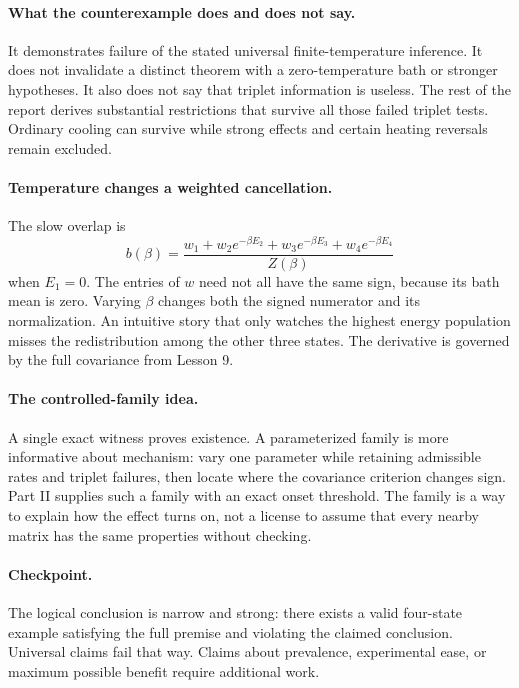 \paragraph{What the counterexample does and does not say.}
It demonstrates failure of the stated universal finite-temperature
inference. It does not invalidate a distinct theorem with a zero-temperature
bath or stronger hypotheses. It also does not say that triplet information
is useless. The rest of the report derives substantial restrictions that
survive all those failed triplet tests. Ordinary cooling can survive while
strong effects and certain heating reversals remain excluded.

\paragraph{Temperature changes a weighted cancellation.}
The slow overlap is
\[
b(\beta)=\frac{w_1+w_2e^{-\beta E_2}
+w_3e^{-\beta E_3}+w_4e^{-\beta E_4}}{Z(\beta)}
\]
when $E_1=0$. The entries of $w$ need not all have the same sign, because
its bath mean is zero. Varying $\beta$ changes both the signed numerator
and its normalization. An intuitive story that only watches the highest
energy population misses the redistribution among the other three states.
The derivative is governed by the full covariance from Lesson 9.

\paragraph{The controlled-family idea.}
A single exact witness proves existence. A parameterized family is more
informative about mechanism: vary one parameter while retaining admissible
rates and triplet failures, then locate where the covariance criterion
changes sign. Part II supplies such a family with an exact onset threshold.
The family is a way to explain how the effect turns on, not a license to
assume that every nearby matrix has the same properties without checking.

\paragraph{Checkpoint.}
The logical conclusion is narrow and strong: there exists a valid
four-state example satisfying the full premise and violating the claimed
conclusion. Universal claims fail that way. Claims about prevalence,
experimental ease, or maximum possible benefit require additional work.

